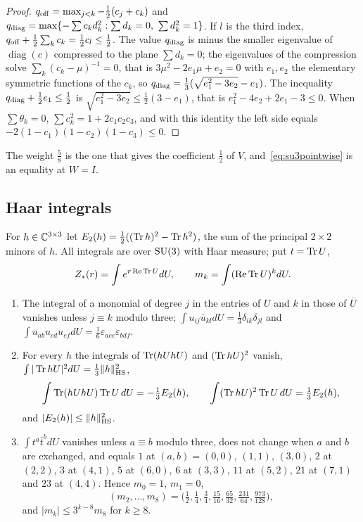 \begin{proof}
$q_{\rm off}=\max_{j<k}-\frac12(c_j+c_k)$ and $q_{\rm diag}=\max\{-\sum c_kd_k^2:
\sum d_k=0,\ \sum d_k^2=1\}$. If $l$ is the third index, $q_{\rm off}+\frac12
\sum_kc_k=\frac12c_l\le\frac12$. The value $q_{\rm diag}$ is minus the smaller
eigenvalue of $\operatorname{diag}(c)$ compressed to the plane $\sum d_k=0$;
the eigenvalues of the compression solve $\sum_k(c_k-\mu)^{-1}=0$, that is
$3\mu^2-2e_1\mu+e_2=0$ with $e_1,e_2$ the elementary symmetric functions of
the $c_k$, so $q_{\rm diag}=\frac13(\sqrt{e_1^2-3e_2}-e_1)$. The inequality
$q_{\rm diag}+\frac12e_1\le\frac12$ is $\sqrt{e_1^2-3e_2}\le\frac12(3-e_1)$, that
is $e_1^2-4e_2+2e_1-3\le0$. When $\sum\theta_k=0$, $\sum c_k^2=1+2c_1c_2c_3$,
and with this identity the left side equals $-2(1-c_1)(1-c_2)(1-c_3)\le0$.
\end{proof}

The weight $\frac58$ is the one that gives the coefficient $\frac12$ of $V$,
and~\eqref{eq:su3pointwise} is an equality at $W=I$.

\subsection{Haar integrals}

For $h\in\mathbb{C}^{3\times3}$ let $E_2(h)=\frac12((\operatorname{Tr} h)^2-\operatorname{Tr} h^2)$, the sum
of the principal $2\times2$ minors of $h$. All integrals are over $\mathrm{SU}(3)$
with Haar measure; put $t=\operatorname{Tr} U$,
\[
Z_*(r)=\int e^{r\operatorname{Re}\operatorname{Tr} U}dU,\qquad m_k=\int(\operatorname{Re}\operatorname{Tr} U)^kdU .
\]

\begin{lemma}\label{lem:su3haar}
\begin{enumerate}[label=\textup{(\roman*)},leftmargin=*]
\item The integral of a monomial of degree $j$ in the entries of $U$ and
$k$ in those of $\bar U$ vanishes unless $j\equiv k$ modulo three;
$\int u_{ij}\bar u_{kl}dU=\frac13\delta_{ik}\delta_{jl}$ and $\int u_{ab}
u_{cd}u_{ef}dU=\frac16\varepsilon_{ace}\varepsilon_{bdf}$.
\item For every $h$ the integrals of $\operatorname{Tr}(hUhU)$ and $(\operatorname{Tr} hU)^2$
vanish, $\int|\operatorname{Tr} hU|^2dU=\frac13\|h\|_{\rm HS}^2$,
\[
\int\operatorname{Tr}(hUhU)\operatorname{Tr} U\,dU=-\tfrac13E_2(h),\qquad
\int(\operatorname{Tr} hU)^2\operatorname{Tr} U\,dU=\tfrac13E_2(h),
\]
and $|E_2(h)|\le\|h\|_{\rm HS}^2$.
\item $\int t^a\bar t^bdU$ vanishes unless $a\equiv b$ modulo three, does
not change when $a$ and $b$ are exchanged, and equals $1$ at $(a,b)=
(0,0)$, $(1,1)$, $(3,0)$, $2$ at $(2,2)$, $3$ at $(4,1)$, $5$ at $(6,0)$,
$6$ at $(3,3)$, $11$ at $(5,2)$, $21$ at $(7,1)$ and $23$ at $(4,4)$.
Hence $m_0=1$, $m_1=0$,
\[
(m_2,\dots,m_8)=\bigl(\tfrac12,\tfrac14,\tfrac34,\tfrac{15}{16},
\tfrac{65}{32},\tfrac{231}{64},\tfrac{973}{128}\bigr),
\]
and $|m_k|\le3^{k-8}m_8$ for $k\ge8$.
\end{enumerate}
\end{lemma}

